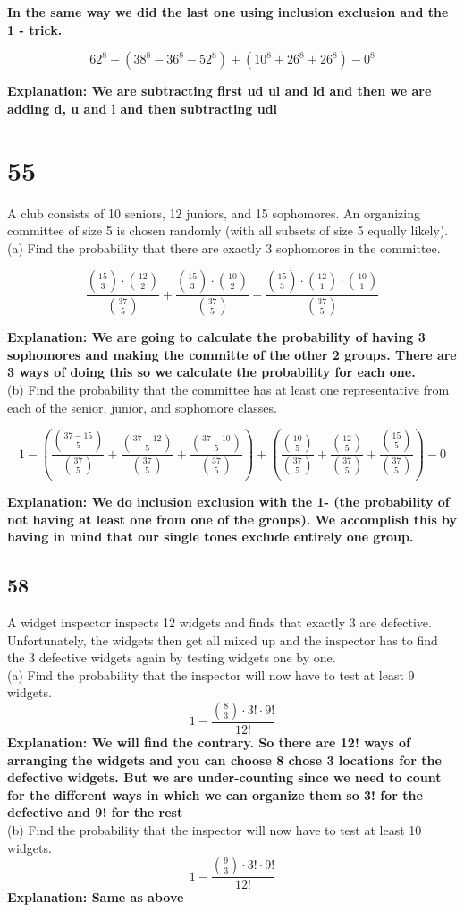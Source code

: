 \documentclass{article}
\begin{document}
\textbf{In the same way we did the last one using inclusion exclusion and the 1 - trick.}

$$62^8-(38^8-36^8-52^8)+ (10^8 + 26 ^8 + 26 ^8)-0^8$$

\textbf{Explanation: We are subtracting first ud ul and ld and then we are adding d, u and l and then subtracting udl}
\section{55}
A club consists of 10 seniors, 12 juniors, and 15 sophomores. An organizing committee of size 5 is chosen randomly (with all subsets of size 5 equally likely).\\
(a) Find the probability that there are exactly 3 sophomores in the committee.

$$\frac{\binom{15}{3} \cdot \binom{12}{2}}{\binom{37}{5}} + \frac{\binom{15}{3} \cdot \binom{10}{2}}{\binom{37}{5}}+ \frac{ \binom{15}{3} \cdot \binom{12}{1} \cdot \binom{10}{1}}{\binom{37}{5}}$$ 

\textbf{Explanation: We are going to calculate the probability of having 3 sophomores and making the committe of the other 2 groups. There are 3 ways of doing this so we calculate the probability for each one.}\\
(b) Find the probability that the committee has at least one representative from each of the senior, junior, and sophomore classes.

$$1 - (\frac{\binom{37-15}{5}}{\binom{37}{5}} + \frac{\binom{37-12}{5}}{\binom{37}{5}} + \frac{\binom{37-10}{5}}{\binom{37}{5}})+(\frac{\binom{10}{5}}{\binom{37}{5}}+ \frac{\binom{12}{5}}{\binom{37}{5}} + \frac{\binom{15}{5}}{\binom{37}{5}})-0$$

\textbf{Explanation: We do inclusion exclusion with the 1- (the probability of not having at least one from one of the groups). We accomplish this by having in mind that our single tones exclude entirely one group.}

\subsection{58}
A widget inspector inspects 12 widgets and ﬁnds that exactly 3 are defective. Unfortunately, the widgets then get all mixed up and the inspector has to ﬁnd the 3 defective widgets again by testing widgets one by one.\\
(a) Find the probability that the inspector will now have to test at least 9 widgets.
$$1-\frac{\binom{8}{3} \cdot 3! \cdot 9!}{12!}$$
\textbf{Explanation: We will find the contrary. So there are 12! ways of arranging the widgets and you can choose 8 chose 3 locations for the defective widgets. But we are under-counting since we need to count for the different ways in which we can organize them so 3! for the defective and 9! for the rest
}
\\
(b) Find the probability that the inspector will now have to test at least 10 widgets.
$$1-\frac{\binom{9}{3} \cdot 3! \cdot 9!}{12!}$$
\textbf{Explanation: Same as above}
\end{document}
